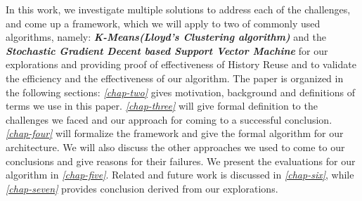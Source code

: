 In this work, we investigate multiple solutions to address each of the challenges, and come up a framework, which we will apply to two of commonly used algorithms, namely: \textbf{\textit{K-Means(Lloyd’s Clustering algorithm)}} and the \textbf{\textit{Stochastic Gradient Decent based Support Vector Machine}} for our explorations and providing proof of effectiveness of History Reuse and to validate the efficiency and the effectiveness of our algorithm.
The paper is organized in the following sections: \textit{\ref{chap-two}} gives motivation, background and definitions of terms we use in this paper. \textit{\ref{chap-three}} will give formal definition to the challenges we faced and our approach for coming to a successful conclusion. \textit{\ref{chap-four}} will formalize the framework and give the formal algorithm for our architecture. We will also discuss the other approaches we used to come to our conclusions and give reasons for their failures. We present the evaluations for our algorithm in \textit{\ref{chap-five}}. Related and future work is discussed in \textit{\ref{chap-six}}, while \textit{\ref{chap-seven}} provides conclusion derived from our explorations.
